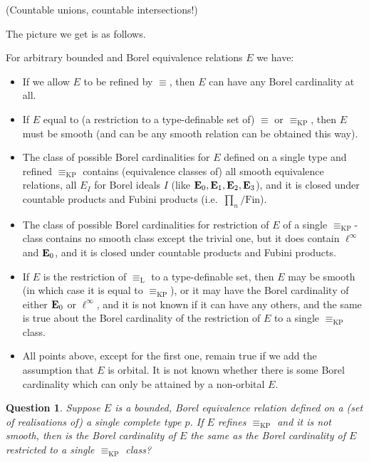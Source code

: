 \documentclass[final,a4paper,12pt]{amsart}
\newcommand\Lasc{{\mathrm{L}}}
\newcommand\KP{{\mathrm{KP}}}
\newcommand{\Fin}{\mathrm{Fin}}
\newtheorem{qu}[thm]{Question}
\theoremstyle{remark}
\theoremstyle{definition}
\begin{document}
	(Countable unions, countable intersections!)
	
	The picture we get is as follows.
	
	For arbitrary bounded and Borel equivalence relations $E$ we have:
	\begin{itemize}
		\item
		If we allow $E$ to be refined by $\equiv$, then $E$ can have any Borel cardinality at all.
		\item
		If $E$ equal to (a restriction to a type-definable set of) $\equiv$ or $\equiv_{\KP}$, then $E$ must be smooth (and can be any smooth relation can be obtained this way).
		\item
		The class of possible Borel cardinalities for $E$ defined on a single type and refined $\equiv_{\KP}$ contains (equivalence classes of) all smooth equivalence relations, all $E_I$ for Borel ideals $I$ (like ${\bf E}_0,{\bf E}_1,{\bf E}_2,{\bf E}_3$), and it is closed under countable products and Fubini products (i.e.\ $\prod_n/\Fin$).
		\item
		The class of possible Borel cardinalities for restriction of $E$ of a single $\equiv_{\KP}$-class contains no smooth class except the trivial one, but it does contain $\ell^\infty$ and ${\bf E}_0$, and it is closed under countable products and Fubini products.
		\item
		If $E$ is the restriction of ${\equiv_{\Lasc}}$ to a type-definable set, then $E$ may be smooth (in which case it is equal to $\equiv_{\KP}$), or it may have the Borel cardinality of either ${\bf E}_0$ or $\ell^\infty$, and it is not known if it can have any others, and the same is true about the Borel cardinality of the restriction of $E$ to a single ${\equiv_{\KP}}$ class.
		\item
		All points above, except for the first one, remain true if we add the assumption that $E$ is orbital. It is not known whether there is some Borel cardinality which can only be attained by a non-orbital $E$.
	\end{itemize}
	
	\begin{qu}
		Suppose $E$ is a bounded, Borel equivalence relation defined on a (set of realisations of) a single complete type $p$. If $E$ refines $\equiv_{\KP}$ and it is not smooth, then is the Borel cardinality of $E$ the same as the Borel cardinality of $E$ restricted to a single ${\equiv_{\KP}}$ class?
	\end{qu}
	
	
	
\end{document}
